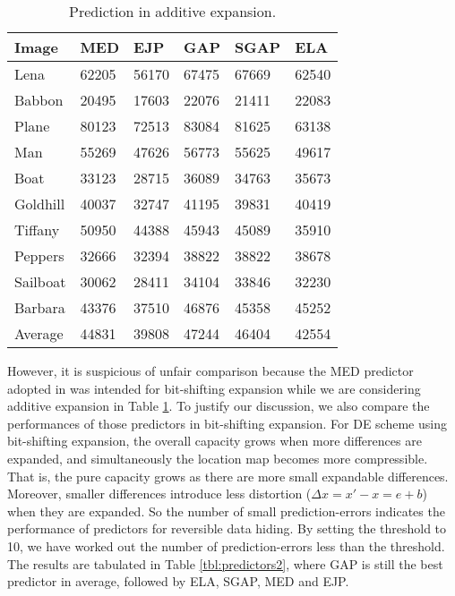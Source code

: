 \documentclass{sig-alternate}
\begin{document}
\begin{table}
    \centering
    \caption{\label{tbl:predictors}Prediction in additive expansion.}
  \begin{tabular}{llllll}\hline\hline
    Image & MED & EJP & GAP & SGAP & ELA \\\hline
     Lena & 62205  & 56170  & 67475  & 67669  & 62540 \\
 Babbon & 20495  & 17603  & 22076  & 21411  & 22083 \\
 Plane  & 80123  & 72513  & 83084  & 81625  & 63138 \\
 Man    & 55269  & 47626  & 56773  & 55625  & 49617 \\
 Boat   & 33123  & 28715  & 36089  & 34763  & 35673 \\
 Goldhill & 40037  & 32747  & 41195  & 39831  & 40419 \\
 Tiffany & 50950  & 44388  & 45943  & 45089  & 35910 \\
 Peppers & 32666  & 32394  & 38822  & 38822  & 38678 \\
 Sailboat& 30062  & 28411  & 34104  & 33846  & 32230 \\
 Barbara & 43376  & 37510  & 46876  & 45358  & 45252 \\
 Average & 44831  & 39808  & 47244  & 46404  & 42554 \\\hline\hline
  \end{tabular}
\end{table}

However, it is suspicious of unfair comparison because the MED predictor adopted in
\cite{Thodi07pee,Kuribayashi08,Hu2009} was intended for bit-shifting expansion while we are
considering additive expansion in Table \ref{tbl:predictors}. To justify our discussion, we also
compare the performances of those predictors in bit-shifting expansion. For DE scheme using
bit-shifting expansion, the overall capacity grows when more differences are expanded, and
simultaneously the location map becomes more compressible. That is, the pure capacity grows as there
are more small expandable differences. Moreover, smaller differences introduce less distortion
($\Delta x = x' - x = e + b$) when they are expanded. So the number of small prediction-errors
indicates the performance of predictors for reversible data hiding. By setting the threshold to 10,
we have worked out the number of prediction-errors less than the threshold. The results are
tabulated in Table \ref{tbl:predictors2}, where GAP is still the best predictor in average, followed
by ELA, SGAP, MED and EJP.
\end{document}

